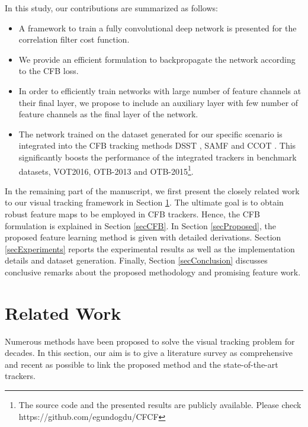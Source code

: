 \documentclass[journal]{IEEEtran}
\begin{document}
In this study, our contributions are summarized as follows:
\begin{itemize}
\item A framework to train a fully convolutional deep network is presented for the correlation filter cost function.
\item We provide an efficient formulation to backpropagate the network according to the CFB loss.
\item In order to efficiently train networks with large number of feature channels at their final layer, we propose to include an auxiliary layer with few number of feature channels as the final layer of the network.
\item The network trained on the dataset generated for our specific scenario is integrated into the CFB tracking methods DSST \cite{DSST}, SAMF \cite{SAMF} and CCOT \cite{CCOT}. This significantly boosts the performance of the integrated trackers in benchmark datasets, VOT2016, OTB-2013 and OTB-2015\footnote{The source code and the presented results are publicly available. Please check https://github.com/egundogdu/CFCF}.
\end{itemize}





In the remaining part of the manuscript, we first present the closely related work to our visual tracking framework in Section \ref{secRelated}. The ultimate goal is to obtain robust feature maps to be employed in CFB trackers. Hence, the CFB formulation is explained in Section \ref{secCFB}. In Section \ref{secProposed}, the proposed feature learning method is given with detailed derivations. Section \ref{secExperiments} reports the experimental results as well as the implementation details and dataset generation. Finally, Section \ref{secConclusion} discusses conclusive remarks about the proposed methodology and promising feature work.

\section{Related Work}
\label{secRelated}
Numerous methods have been proposed to solve the visual tracking problem for decades. In this section, our aim is to give a literature survey as comprehensive and recent as possible to link the proposed method and the state-of-the-art trackers.
\end{document}
